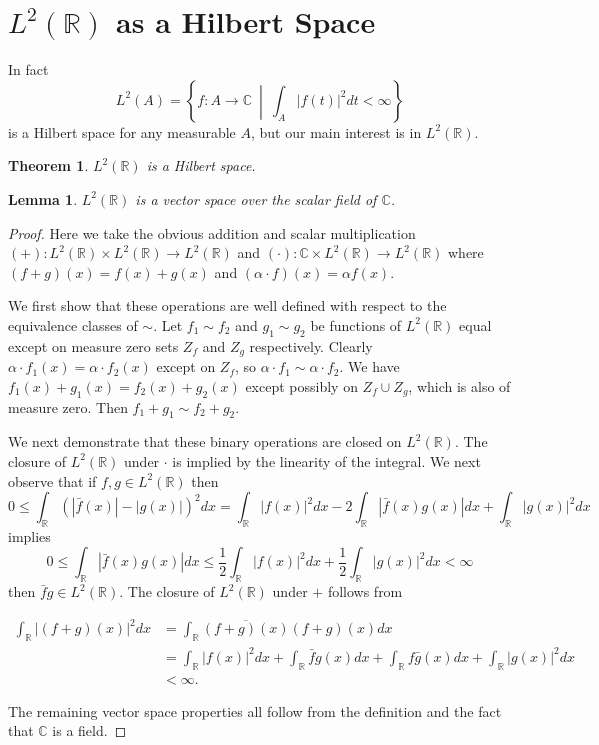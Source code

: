 \documentclass{report}
\newtheorem{thm:hilbert}[thm:ellwave]{Theorem}
\newtheorem{thm:vectorSpace}[thm:ellwave]{Lemma}
\newcommand{\R}{\mathbb{R}}
\newcommand{\C}{\mathbb{C}}
\begin{document}
\section{$L^2 (\R)$ as a Hilbert Space}

In fact $$L^2 (A )=\left \{ f: A \to \C \ \middle| \ \int_{A} |f(t)|^2 dt < \infty \right \}$$ is a Hilbert space for any measurable $A$, but our main interest is in $L^2 (\R)$.

\begin{thm:hilbert}
$L^2 (\R )$ is a Hilbert space.
\end{thm:hilbert}

\begin{thm:vectorSpace}
$L^2 (\R )$ is a vector space over the scalar field of $\C$.
\end{thm:vectorSpace}
\begin{proof}
Here we take the obvious addition and scalar multiplication $ (+ ): L^2 (\R )\times L^2 (\R ) \to L^2 (\R )$ and $( \cdot ): \C \times L^2 (\R ) \to L^2 (\R )$ where $(f+g)(x)=f(x)+g(x)$ and $(\alpha \cdot f) (x)= \alpha f(x)$.

We first show that these operations are well defined with respect to the equivalence classes of $\sim$.
Let $f_1 \sim f_2$ and $g_1 \sim g_2$  be functions of $L^2 (\R )$ equal except on measure zero sets $Z_f$ and $Z_g$ respectively.
Clearly $\alpha \cdot f_1 (x) = \alpha \cdot f_2 (x)$ except on $Z_f$, so $\alpha \cdot f_1 \sim \alpha \cdot f_2$.
We have $f_1(x)+g_1(x)=f_2(x)+g_2(x)$ except possibly on $Z_f \cup Z_g$, which is also of measure zero.
Then $f_1+g_1 \sim f_2+g_2$.

We next demonstrate that these binary operations are closed on $L^2 (\R )$. The closure of $L^2 (\R )$ under $\cdot$ is implied by the linearity of the integral. We next observe that if $f,g \in L^2 (\R )$ then
$$
0\leq \int_\R \left (|\bar f(x)|-|g(x)| \right )^2 dx = \int_\R |f(x)|^2 dx -2 \int_\R |\bar f(x)g(x)| dx + \int_\R |g(x)|^2 dx
$$
implies
$$
0 \leq \int_\R |\bar f(x)g(x)| dx \leq \frac 1 2 \int_\R |f(x)|^2 dx + \frac 1 2 \int_\R |g(x)|^2 dx < \infty
$$
then $\bar f g \in L^2(\R)$. The closure of $L^2 (\R )$ under $+$ follows from

\begin{align*}
\int_\R |(f+g) (x)|^2 dx & =\int_\R \overline{(f+g)(x)}(f+g)(x) dx \\
& =\int_\R |f(x)|^2 dx + \int_\R \bar f g (x) dx + \int_\R f \bar g (x) dx + \int_\R |g(x)|^2 dx \\
&<\infty.
\end{align*}

The remaining vector space properties all follow from the definition and the fact that $\C$ is a field. 
\end{proof}
\end{document}
